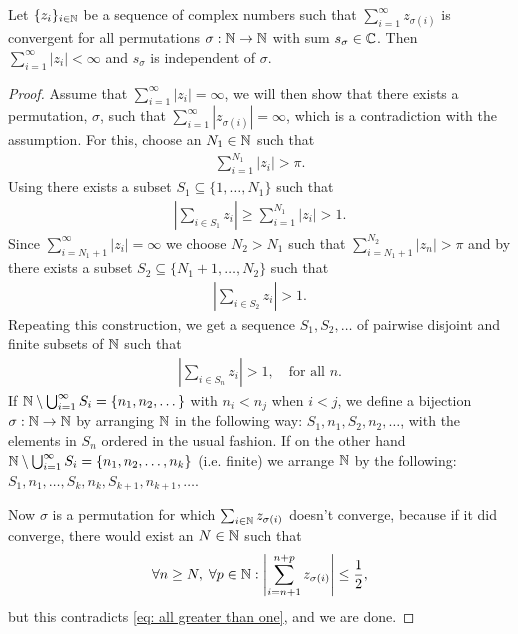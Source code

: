 \documentclass[../../main.tex]{subfiles}
\begin{document}
\begin{proposition}\label{prop: unconditionally implies absolutely}
Let $\{z_{i}\}_{i\in \mathbb{N}}$ be a sequence of complex numbers such that $\sum_{i=1}^{\infty}z_{\sigma(i)}$ is convergent for all permutations $\sigma:\mathbb{N} \to \mathbb{N}$ with sum $s_{\sigma}\in \mathbb{C}$. Then $\sum_{i=1}^{\infty}|z_{i}|<\infty$ and $s_{\sigma}$ is independent of $\sigma$.
\end{proposition}
\begin{proof}
Assume that $\sum_{i=1}^{\infty}|z_{i}|=\infty$, we will then show that there exists a permutation, $\sigma$, such that $\sum_{i=1}^{\infty}|z_{\sigma(i)}|=\infty$, which is a contradiction with the assumption. For this, choose an $N_{1}\in \mathbb{N}$ such that
\begin{align*}
	\sum_{i=1}^{N_{1}}|z_{i}| > \pi.
\end{align*}
Using  there exists a subset $S_{1}\subseteq \{1, \dots, N_{1}\}$ such that
\begin{align*}
	\left|\sum_{i\in S_{1}}z_{i}\right| \ge \sum_{i=1}^{N_{1}}|z_{i}| > 1.
\end{align*}
Since $\sum_{i=N_{1}+1}^{\infty}|z_{i}|=\infty$ we choose $N_{2}>N_{1}$ such that $\sum_{i=N_{1}+1}^{N_{2}}|z_{n}|>\pi$ and by  there exists a subset $S_{2}\subseteq \{N_{1}+1, \dots, N_{2}\}$ such that
\begin{align*}
	\left|\sum_{i\in S_{2}} z_{i} \right| > 1.
\end{align*}
Repeating this construction, we get a sequence $S_{1}, S_{2}, \dots $ of pairwise disjoint and finite subsets of $\mathbb{N}$ such that
\begin{align}
	\left| \sum_{i\in S_{n}}z_{i}\right| > 1, \quad \text{for all } n. \label{eq: all greater than one}
\end{align}
If $\mathbb{N}\setminus \bigcup_{i=1}^{\infty}S_{i}=\{n_{1}, n_{2}, \dots \}$ with $n_{i}<n_{j}$ when $i<j$, we define a bijection $\sigma:\mathbb{N} \to \mathbb{N}$ by arranging $\mathbb{N}$ in the following way: $S_{1},n_{1}, S_{2},n_{2}, \dots$, with the elements in $S_{n}$ ordered in the usual fashion. If on the other hand $\mathbb{N}\setminus \bigcup_{i=1}^{\infty}S_{i}=\{n_{1}, n_{2}, \dots, n_{k} \}$ (i.e. finite) we arrange $\mathbb{N}$ by the following: $S_{1},n_{1}, \dots, S_{k},n_{k},S_{k+1},n_{k+1}, \dots$.

Now $\sigma$ is a permutation for which $\sum_{i\in \mathbb{N}} z_{\sigma(i)}$ doesn't converge, because if it did converge, there would exist an $N\in \mathbb{N}$ such that
\begin{align*}
	\forall n\ge N, \; \forall p\in \mathbb{N}: \left| \sum_{i=n+1}^{n+p} z_{\sigma(i)} \right| \le \frac{1}{2},
\end{align*}
but this contradicts \eqref{eq: all greater than one}, and we are done.
\end{proof}
\end{document}
